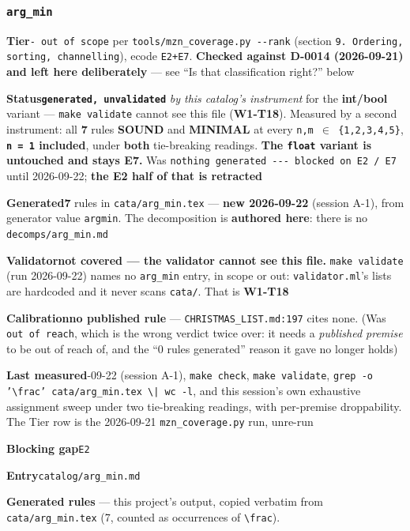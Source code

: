 \documentclass[10pt,a4paper]{article}
\newcommand{\entryfield}[2]{{\raggedright\textbf{#1}\quad #2\par}}
\begin{document}
\subsubsection*{\texttt{arg\_\allowbreak{}min}}
\label{entry:arg-min}
\entryfield{Tier}{\texttt{- out of scope} per \texttt{tools/\allowbreak{}mzn\_\allowbreak{}coverage.\allowbreak{}py -\allowbreak{}-\allowbreak{}rank} (section \texttt{9.\allowbreak{} Ordering, sorting, channelling}), ecode \texttt{E2+E7}. \textbf{Checked against D-0014 (2026-09-21) and left here deliberately} --- see ``Is that classification right?'' below}
\entryfield{Status}{\textbf{\texttt{generated, unvalidated}} \emph{by this catalog's instrument} for the \textbf{int/bool} variant --- \texttt{make validate} cannot see this file (\textbf{W1-T18}). Measured by a second instrument: all \textbf{7} rules \textbf{SOUND} and \textbf{MINIMAL} at every \texttt{n,m $\in$ \{1,2,3,4,5\}}, \textbf{\texttt{n = 1} included}, under \textbf{both} tie-breaking readings. \textbf{The \texttt{float} variant is untouched and stays E7.} Was \texttt{nothing generated -\allowbreak{}-\allowbreak{}-\allowbreak{} blocked on E2 /\allowbreak{} E7} until 2026-09-22; \textbf{the E2 half of that is retracted}}
\entryfield{Generated}{\textbf{7} rules in \texttt{cata/arg\_min.tex} --- \textbf{new 2026-09-22} (session A-1), from generator value \texttt{argmin}. The decomposition is \textbf{authored here}: there is no \texttt{decomps/arg\_min.md}}
\entryfield{Validator}{\textbf{not covered --- the validator cannot see this file.} \texttt{make validate} (run 2026-09-22) names no \texttt{arg\_min} entry, in scope or out: \texttt{validator.ml}'s lists are hardcoded and it never scans \texttt{cata/}. That is \textbf{W1-T18}}
\entryfield{Calibration}{\textbf{no published rule} --- \texttt{CHRISTMAS\_LIST.md:197} cites none. (Was \texttt{out of reach}, which is the wrong verdict twice over: it needs a \emph{published premise} to be out of reach of, and the ``0 rules generated'' reason it gave no longer holds)}
\entryfield{Last measured}{2026-09-22 (session A-1), \texttt{make check}, \texttt{make validate}, \texttt{grep -\allowbreak{}o '\textbackslash{}frac' cata/\allowbreak{}arg\_\allowbreak{}min.\allowbreak{}tex \textbackslash{}| wc -\allowbreak{}l}, and this session's own exhaustive assignment sweep under two tie-breaking readings, with per-premise droppability. The Tier row is the 2026-09-21 \texttt{mzn\_coverage.py} run, unre-run}
\entryfield{Blocking gap}{\texttt{E2}}
\entryfield{Entry}{\texttt{catalog/arg\_min.md}}

\textbf{Generated rules} --- this project's output, copied verbatim from \texttt{cata/arg\_min.tex} (7, counted as occurrences of \texttt{\textbackslash{}frac}).\par
\end{document}
